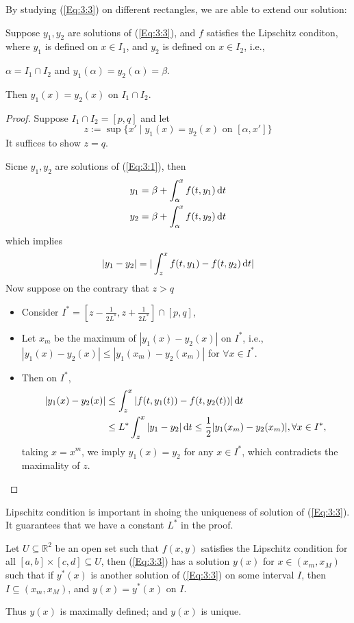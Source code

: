 By studying (\ref{Eq:3:3}) on different rectangles, we are able to extend our solution:

\begin{proposition}
Suppose $y_1,y_2$ are solutions of (\ref{Eq:3:3}), and $f$ satisfies the Lipschitz conditon, where $y_1$ is defined on $x\in I_1$, and $y_2$ is defined on $x\in I_2$, i.e.,

$\alpha=I_1\cap I_2$ and $y_1(\alpha)=y_2(\alpha)=\beta$.

Then $y_1(x)=y_2(x)$ on $I_1\cap I_2$.
\end{proposition}
\begin{proof}
Suppose $I_1\cap I_2=[p,q]$ and let
\[
z:=\sup\{x'\mid y_1(x)=y_2(x)\text{ on }[\alpha,x']\}
\]
It suffices to show $z=q$.

Sicne $y_1,y_2$ are solutions of (\ref{Eq:3:1}), then
\begin{align*}
y_1&=\beta+\int_\alpha^xf(t,y_1)\,\mathrm{d} t\\
y_2&=\beta+\int_\alpha^xf(t,y_2)\,\mathrm{d} t
\end{align*}
which implies
\[
|y_1-y_2|=|\int_z^xf(t,y_1)-f(t,y_2)\,\mathrm{d} t|
\]
Now suppose on the contrary that $z>q$
\begin{itemize}
\item
Consider $I^*=[z-\frac{1}{2L^*},z+\frac{1}{2L^*}]\cap[p,q]$,
\item
Let $x_m$ be the maximum of $|y_1(x)-y_2(x)|$ on $I^*$, i.e., $|y_1(x)-y_2(x)|\le |y_1(x_m)-y_2(x_m)|$ for $\forall x\in I^*$.
\item
Then on $I^*$,
\begin{align*}
|y_1(x)-y_2(x)|&\le \int_z^x|f(t,y_1(t))-f(t,y_2(t))|\,\mathrm{d} t\\&\le
L^*\int_z^x|y_1-y_2|\,\mathrm{d} t\le \frac{1}{2}|y_1(x_m)-y_2(x_m)|,\forall x\in I^*,
\end{align*}
taking $x=x^m$, we imply $y_1(x)=y_2$ for any $x\in I^*$, which contradicts the maximality of $z$.
\end{itemize}
\end{proof}
\begin{remark}
Lipschitz condition is important in shoing the uniqueness of solution of (\ref{Eq:3:3}). It guarantees that we have a constant $L^*$ in the proof.
\end{remark}

\begin{corollary}
Let $U\subseteq\mathbb{R}^2$ be an open set such that $f(x,y)$ satisfies the Lipschitz condition for all $[a,b]\times[c,d]\subseteq U$, then (\ref{Eq:3:3}) has a solution $y(x)$ for $x\in(x_m,x_M)$ such that 
if $y^*(x)$ is another solution of (\ref{Eq:3:3}) on some interval $I$, then $I\subseteq(x_m,x_M)$, and $y(x)=y^*(x)$ on $I$.

Thus $y(x)$ is maximally defined; and $y(x)$ is unique.
\end{corollary}

